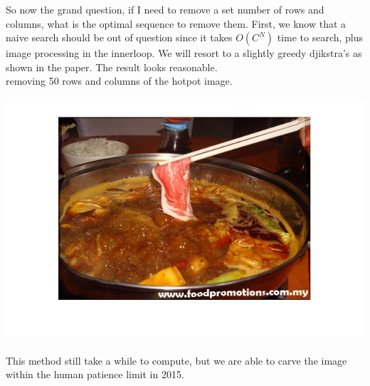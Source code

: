 \documentclass[english]{article}
\begin{document}
So now the grand question, if I need to remove a set number of rows and columns, what is the optimal sequence to remove them. First, we know that a naive search should be out of question since it takes $O(C^N)$ time to search, plus image processing in the innerloop. We will resort to a slightly greedy djikstra's as shown in the paper. The result looks reasonable. \\
removing 50 rows and columns of the hotpot image.\\\\
\includegraphics[scale=0.8]{carving/hotpot5050.jpg}\\\\
This method still take a while to compute, but we are able to carve the image within the human patience limit in 2015.
\end{document}
